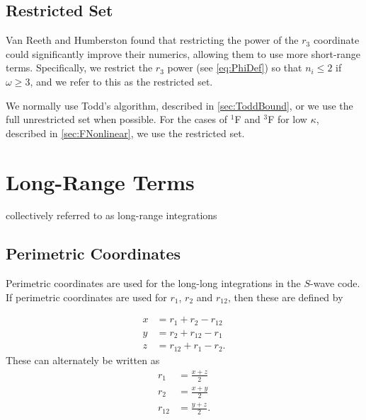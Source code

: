 \documentclass[Dissertation.tex]{subfiles}
\begin{document}
\subsection{Restricted Set}
\label{sec:Restricted}
Van Reeth and Humberston \cite{VanReeth2003} found that restricting the power 
of the $r_3$ coordinate could significantly improve their numerics, allowing 
them to use more short-range terms. Specifically, we restrict the $r_3$ power 
(see \cref{eq:PhiDef}) so that $n_i \leq 2$ if $\omega \geq 3$, and we refer 
to this as the restricted set.

We normally use Todd's algorithm, described in \cref{sec:ToddBound}, or we 
use the full unrestricted set when possible. For the cases of $^1$F and $^3$F 
for low $\kappa$, described in \cref{sec:FNonlinear}, we use the restricted 
set.


\section{Long-Range Terms}
\label{sec:CompLong}

collectively referred to as long-range integrations


\subsection{Perimetric Coordinates}
\label{sec:PerimetricCoords}

Perimetric coordinates are used for the long-long integrations in the $S$-wave code. If perimetric coordinates are used for $r_1$, $r_2$ and $r_{12}$, then these are defined by \cite{Armour1991}

\begin{align}
\label{eq:PerimetricCoords1}
\nonumber x &= r_1 + r_2 - r_{12} \\
\nonumber y &= r_2 + r_{12} - r_1 \\
z &= r_{12} + r_1 - r_2.
\end{align}
These can alternately be written as
\begin{align}
\label{eq:PerimetricCoords2}
\nonumber r_1 &= \frac{x+z}{2} \\
\nonumber r_2 &= \frac{x+y}{2} \\
\nonumber r_{12} &= \frac{y+z}{2}.
\end{align}
\end{document}

